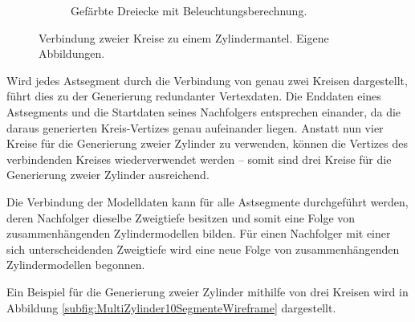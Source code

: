 \begin{figure} [hbtp]
\begin{subfigure}[t]{.4\textwidth}
	\caption{Gefärbte Dreiecke mit Beleuchtungsberechnung.}
	\label{subfig:Zylinder10SegmenteOpaque}
\end{subfigure}
\caption{Verbindung zweier Kreise zu einem Zylindermantel. Eigene Abbildungen.}
\label{fig:Zylinder10Segmente}
\end{figure}

Wird jedes Astsegment durch die Verbindung von genau zwei Kreisen dargestellt, führt dies zu der Generierung redundanter Vertexdaten. Die Enddaten eines Astsegments und die Startdaten seines Nachfolgers entsprechen einander, da die daraus generierten Kreis-Vertizes genau aufeinander liegen. Anstatt nun vier Kreise für die Generierung zweier Zylinder zu verwenden, können die Vertizes des verbindenden Kreises wiederverwendet werden -- somit sind drei Kreise für die Generierung zweier Zylinder ausreichend.

Die Verbindung der Modelldaten kann für alle Astsegmente durchgeführt werden, deren Nachfolger dieselbe Zweigtiefe besitzen und somit eine Folge von zusammenhängenden Zylindermodellen bilden. Für einen Nachfolger mit einer sich unterscheidenden Zweigtiefe wird eine neue Folge von zusammenhängenden Zylindermodellen begonnen. \cite{ModelingByNumbersZylindersA:13}

Ein Beispiel für die Generierung zweier Zylinder mithilfe von drei Kreisen wird in Abbildung \ref{subfig:MultiZylinder10SegmenteWireframe} dargestellt.

